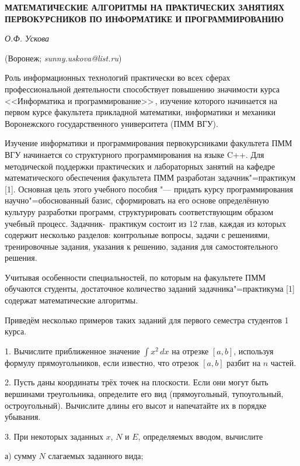 \begin{center}
    {\bf МАТЕМАТИЧЕСКИЕ АЛГОРИТМЫ НА ПРАКТИЧЕСКИХ ЗАНЯТИЯХ ПЕРВОКУРСНИКОВ ПО ИНФОРМАТИКЕ И ПРОГРАММИРОВАНИЮ}

    {\it О.Ф. Ускова}

    (Воронеж; {\it sunny.uskova@list.ru})
\end{center}


Роль информационных технологий практически во всех сферах профессиональной деятельности способствует повышению значимости
курса <<Информатика и программирование>>\,, изучение которого начинается на первом курсе факультета прикладной математики,
информатики и механики Воронежского государственного университета \linebreak (ПММ ВГУ).

Изучение информатики и программирования первокурсниками факультета ПММ ВГУ начинается со структурного программирования
на языке C++. Для методической поддержки практических и лабораторных занятий на кафедре математического обеспечения
факультета ПММ разработан задачник"=практикум [1]. Основная цель этого учебного пособия "--- придать курсу программирования
научно"=обоснованный базис, сформировать на его основе определённую культуру разработки программ, структурировать
соответствующим образом учебный процесс. Задачник-~практикум состоит из 12 глав, каждая из которых содержит несколько
разделов: контрольные вопросы, задачи с решениями, тренировочные задания, указания к решению, задания для самостоятельного
решения.

Учитывая особенности специальностей, по которым на факультете ПММ обучаются студенты, достаточное количество заданий
задачника"=практикума [1] содержат математические алгоритмы.

Приведём несколько примеров таких заданий для первого семестра студентов 1 курса.

1. Вычислите приближенное значение $\int x^2\,dx$ на отрезке $[a, b]$, используя формулу прямоугольников, если
известно, что отрезок $[a, b]$ разбит на $n$ частей.

2. Пусть даны координаты трёх точек на плоскости. Если они могут быть вершинами треугольника, определите его
вид (прямоугольный, тупоугольный, остроугольный). Вычислите длины его высот и напечатайте их в порядке убывания.

3. При некоторых заданных $x$, $N$ и $E$, определяемых вводом, вычислите

а) сумму $N$ слагаемых заданного вида;

